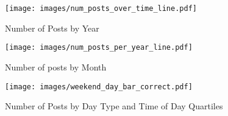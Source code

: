 \begin{figure*}[t]
    \centering
    \begin{subfigure}[t]{0.348\textwidth}
        \centering
        \vspace{0pt}
          \texttt{[image: images/num\_posts\_over\_time\_line.pdf]}
          \caption{Number of Posts by Year}
        \label{fig:posts_per_year}
    \end{subfigure}
    \hfill
    \begin{subfigure}[t]{0.372\textwidth}
        \centering
        \vspace{0pt}
          \texttt{[image: images/num\_posts\_per\_year\_line.pdf]}
          \caption{Number of posts by Month}
        \label{fig:posts_per_month}
        \end{subfigure}
    \hfill
    \begin{subfigure}[t]{0.24\textwidth}
        \centering
        \vspace{0pt}
        \texttt{[image: images/weekend\_day\_bar\_correct.pdf]}
        \caption{Number of Posts by Day Type and Time of Day Quartiles}
        \label{fig:posts_weekend}
        \end{subfigure}

    \medskip


\end{figure*}
